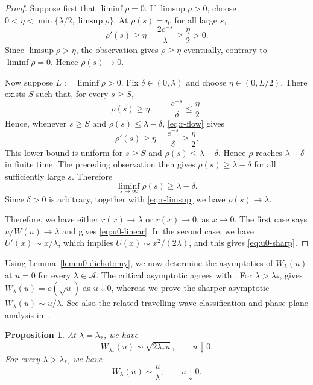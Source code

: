 \documentclass[12pt]{amsart}
\numberwithin{equation}{section}
\theoremstyle{plain}
\newtheorem{proposition}[theorem]{Proposition}
\theoremstyle{definition}
\begin{document}
\begin{proof}
Suppose first that \(\liminf\rho=0\).  If \(\limsup\rho>0\), choose
\(0<\eta<\min\{\lambda/2,\limsup\rho\}\).  At \(\rho(s)=\eta\), for all large \(s\),
\[
 \rho'(s)\ge\eta-\frac{2e^{-s}}\lambda\ge\frac\eta2>0.
\]
Since \(\limsup\rho>\eta\), the observation gives \(\rho\ge\eta\) eventually,
contrary to \(\liminf\rho=0\).  Hence \(\rho(s)\to0\).

Now suppose \(L:=\liminf\rho>0\).  Fix \(\delta\in(0,\lambda)\) and choose
\(\eta\in(0,L/2)\).  There exists \(S\) such that, for every \(s\ge S\),
\[
 \rho(s)\ge\eta,
 \qquad
 \frac{e^{-s}}\delta\le\frac\eta2.
\]
Hence, whenever \(s\ge S\) and \(\rho(s)\le\lambda-\delta\),
\eqref{eq:r-flow} gives
\[
 \rho'(s)
 \ge\eta-\frac{e^{-s}}\delta
 \ge\frac\eta2.
\]
This lower bound is uniform for $s\ge S$ and
$\rho(s)\le\lambda-\delta$.  Hence $\rho$ reaches
$\lambda-\delta$ in finite time.  The preceding observation then gives
\(\rho(s)\ge\lambda-\delta\) for all sufficiently large \(s\).  Therefore
\[
 \liminf_{s\to\infty}\rho(s)\ge\lambda-\delta.
\]
Since \(\delta>0\) is arbitrary, together with \eqref{eq:r-limsup} we have
\(\rho(s)\to\lambda\).

Therefore, we have either \(r(x)\to \lambda\) or \(r(x)\to0\), as \(x\to 0\).  The first case says
\(u/W(u)\to \lambda\) and gives \eqref{eq:u0-linear}.  In the second case, we have
\(U'(x)\sim x/\lambda\), which implies
\(U(x)\sim x^2/(2\lambda)\), and this gives
\eqref{eq:u0-sharp}.
\end{proof}

Using Lemma~\ref{lem:u0-dichotomy}, we now determine the asymptotics of
$W_\lambda(u)$ at $u=0$ for every $\lambda\in\mathcal A$.
The critical asymptotic agrees with
\cite[Theorem~3.3(b)]{EnguicaGavioliSanchez2013}.
For $\lambda>\lambda_*$, \cite[Theorem~3.3(a)]{EnguicaGavioliSanchez2013}
gives $W_\lambda(u)=o(\sqrt u)$ as $u\downarrow0$, whereas we prove the
sharper asymptotic $W_\lambda(u)\sim u/\lambda$.
See also the related travelling-wave classification and phase-plane analysis
in~\cite{AudritoVazquez2017}.

\begin{proposition}
\label{prop:critical-branches}
At \(\lambda = \lambda_*\), we have
\begin{equation}
 W_{\lambda_*}(u)\sim\sqrt{2\lambda_*u},
 \qquad u\downarrow0.
 \label{eq:critical-sharp-branch}
\end{equation}
For every \(\lambda>\lambda_*\), we have
\begin{equation}
 W_\lambda(u)\sim\frac u\lambda,
 \qquad u\downarrow0.
 \label{eq:supercritical-linear-branch}
\end{equation}
\end{proposition}
\end{document}
